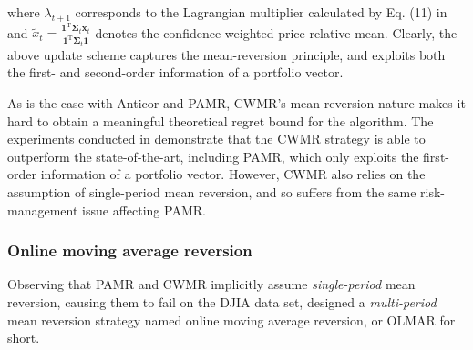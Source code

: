 where $\lambda_{t+1}$ corresponds to the Lagrangian multiplier calculated by Eq. (11) in \citep{li13} and $\widetilde{x}_t = \frac{\mathbf{1}^\text{T}\boldsymbol{\Sigma}_t\mathbf{x}_t}{\mathbf{1}^\text{T}\boldsymbol{\Sigma}_t\mathbf{1}}$ denotes the confidence-weighted price relative mean. Clearly, the above update scheme captures the mean-reversion principle, and exploits both the first- and second-order information of a portfolio vector.

As is the case with Anticor and PAMR, CWMR's mean reversion nature makes it hard to obtain a meaningful theoretical regret bound for the algorithm. The experiments conducted in \citep{cwmr, li13} demonstrate that the CWMR strategy is able to outperform the state-of-the-art, including PAMR, which only exploits the first-order information of a portfolio vector. However, CWMR also relies on the assumption of single-period mean reversion, and so suffers from the same risk-management issue affecting PAMR.

\subsubsection{Online moving average reversion}

Observing that PAMR and CWMR implicitly assume \emph{single-period} mean reversion, causing them to fail on the DJIA data set, \citet{olmar} designed a \emph{multi-period} mean reversion strategy named online moving average reversion, or OLMAR for short.

